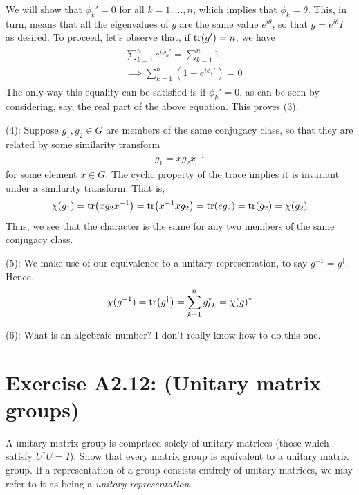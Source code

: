 \documentclass{book}
\begin{document}
    We will show that $\phi_k' = 0$ for all $k = 1,...,n$, which implies that $\phi_k = \theta$. This, in turn, means that all the eigenvalues of $g$ are the same value $e^{i\theta}$, so that $g = e^{i\theta}I$ as desired. To proceed, let's observe that, if $\tr(g') = n$, we have 
    \begin{align}
    \begin{aligned}
        &\sum_{k=1}^n e^{i\phi_k'} = \sum_{k=1}^n 1 \\[6pt]
        &\implies \sum_{k=1}^n (1-e^{i\phi_k'}) = 0
    \end{aligned}
    \end{align}
    The only way this equality can be satisfied is if $\phi_{k}'=0$, as can be seen by considering, say, the real part of the above equation. This proves  (3).
    
    (4): Suppose $g_1, g_2 \in G$ are members of the same conjugacy class, so that they are related by some similarity transform 
    \begin{align}
        g_1 = x g_2 x^{-1}
    \end{align}
    for some element $x\in G$. The cyclic property of the trace implies it is invariant under a similarity transform. That is,
    \begin{align}
        \chi(g_1) = \tr(x g_2 x^{-1}) = \tr(x^{-1} x g_2) = \tr(e g_2) = \tr(g_2) = \chi(g_2)
    \end{align}
    Thus, we see that the character is the same for any two members of the same conjugacy class.
    
    (5): We make use of our equivalence to a unitary representation, to say $g^{-1} = g^\dagger$. Hence,
    \begin{align}
        \chi(g^{-1}) = \tr(g^\dagger) = \sum_{k=1}^n g_{kk}^* = \chi(g)^*
    \end{align}
    
    (6): What is an algebraic number? I don't really know how to do this one.
    
\section*{Exercise A2.12: (Unitary matrix groups)}
    A unitary matrix group is comprised solely of unitary matrices (those which satisfy $U^\dagger U = I$). Show that every matrix group is equivalent to a unitary matrix group. If a representation of a group consists entirely of unitary matrices, we may refer to it as being a \emph{unitary representation}.
    
\end{document}
